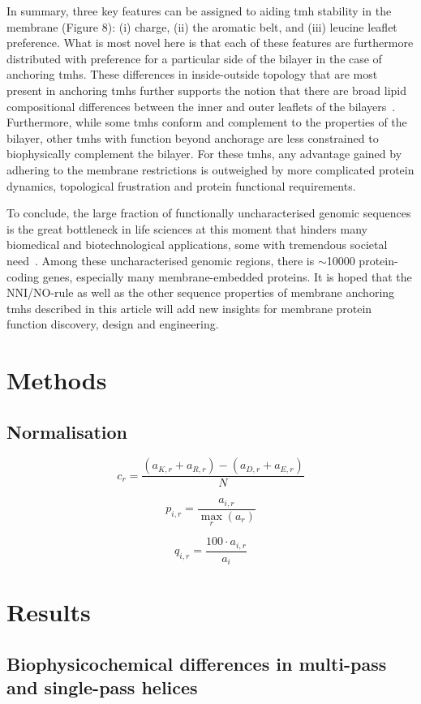 In summary, three key features can be assigned to aiding \gls{tmh} stability in the membrane (Figure 8): (i) charge, (ii) the aromatic belt, and (iii) leucine leaflet preference. What is most novel here is that each of these features are furthermore distributed with preference for a particular side of the bilayer in the case of anchoring \gls{tmh}s. These differences in inside-outside topology that are most present in anchoring \gls{tmh}s further supports the notion that there are broad lipid compositional differences between the inner and outer leaflets of the bilayers~\cite{Sharpe2010}. Furthermore, while some \gls{tmh}s conform and complement to the properties of the bilayer, other \gls{tmh}s with function beyond anchorage are less constrained to biophysically complement the bilayer. For these \gls{tmh}s, any advantage gained by adhering to the membrane restrictions is outweighed by more complicated protein dynamics, topological frustration and protein functional requirements.

To conclude, the large fraction of functionally uncharacterised genomic sequences is the great bottleneck in life sciences at this moment that hinders many biomedical and biotechnological applications, some with tremendous societal need~\cite{Eisenhaber2012,Kuznetsov2013}. Among these uncharacterised genomic regions, there is \(\sim\)10000 protein-coding genes, especially many membrane-embedded proteins. It is hoped that the NNI/NO-rule as well as the other sequence properties of membrane anchoring \gls{tmh}s described in this article will add new insights for membrane protein function discovery, design and engineering.

\section{Methods}

\subsection{Normalisation}

\begin{equation}
c_r=\frac{(a_{K,r}+a_{R,r})-(a_{D,r}+a_{E,r})}{N}
\end{equation}


\begin{equation}
  p_{i,r}=\frac{a_{i,r}}{\underset{r}{\max}{(a_r)}}
\end{equation}

\begin{equation}
  q_{i,r}=\frac{{100}\cdot{a_{i,r}}}{a_i}
\end{equation}

\section{Results}
\subsection{Biophysicochemical differences in multi-pass and single-pass helices}
